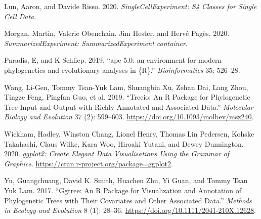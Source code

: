 \documentclass[]{article}
\begin{document}
\hypertarget{refs}{}
\leavevmode\hypertarget{ref-R-SingleCellExperiment}{}%
Lun, Aaron, and Davide Risso. 2020. \emph{SingleCellExperiment: S4 Classes for Single Cell Data}.

\leavevmode\hypertarget{ref-R-SummarizedExperiment}{}%
Morgan, Martin, Valerie Obenchain, Jim Hester, and Hervé Pagès. 2020. \emph{SummarizedExperiment: SummarizedExperiment container}.

\leavevmode\hypertarget{ref-ape2019}{}%
Paradis, E, and K Schliep. 2019. ``ape 5.0: an environment for modern phylogenetics and evolutionary analyses in \{R\}.'' \emph{Bioinformatics} 35: 526--28.

\leavevmode\hypertarget{ref-Wang2019}{}%
Wang, Li-Gen, Tommy Tsan-Yuk Lam, Shuangbin Xu, Zehan Dai, Lang Zhou, Tingze Feng, Pingfan Guo, et al. 2019. ``Treeio: An R Package for Phylogenetic Tree Input and Output with Richly Annotated and Associated Data.'' \emph{Molecular Biology and Evolution} 37 (2): 599--603. \url{https://doi.org/10.1093/molbev/msz240}.

\leavevmode\hypertarget{ref-R-ggplot2}{}%
Wickham, Hadley, Winston Chang, Lionel Henry, Thomas Lin Pedersen, Kohske Takahashi, Claus Wilke, Kara Woo, Hiroaki Yutani, and Dewey Dunnington. 2020. \emph{ggplot2: Create Elegant Data Visualisations Using the Grammar of Graphics}. \url{https://cran.r-project.org/package=ggplot2}.

\leavevmode\hypertarget{ref-Yu2017}{}%
Yu, Guangchuang, David K. Smith, Huachen Zhu, Yi Guan, and Tommy Tsan Yuk Lam. 2017. ``Ggtree: An R Package for Visualization and Annotation of Phylogenetic Trees with Their Covariates and Other Associated Data.'' \emph{Methods in Ecology and Evolution} 8 (1): 28--36. \url{https://doi.org/10.1111/2041-210X.12628}.
\end{document}
